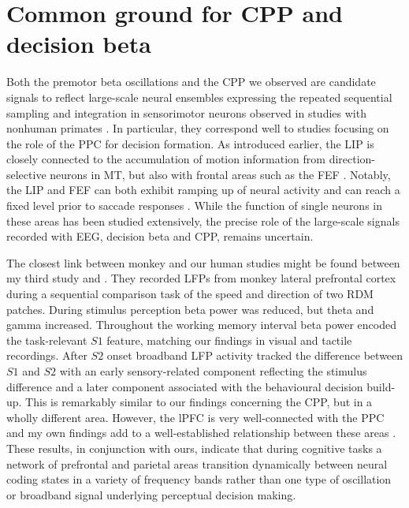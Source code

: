 \section{Common ground for CPP and decision beta}
Both the premotor beta oscillations and the CPP we observed are candidate signals to reflect large-scale neural ensembles expressing the repeated sequential sampling and integration in sensorimotor neurons observed in studies with nonhuman primates \parencite{Gold2007,Hanks2017,Kelly2015,Spitzer2017}. In particular, they correspond well to studies focusing on the role of the PPC for decision formation. As introduced earlier, the LIP is closely connected  to the accumulation of motion information from direction-selective neurons in MT, but also with frontal areas such as the FEF \parencite{Ding2012}. Notably, the LIP and FEF can both exhibit ramping up of neural activity and can reach a fixed level prior to saccade responses \parencite{Ding2010,Ding2012,Hanes1996,Roitman2002}. While the function of single neurons in these areas has been studied extensively, the precise role of the large-scale signals recorded with EEG, decision beta and CPP, remains uncertain.

The closest link between monkey and our human studies might be found between my third study and \textcite{Wimmer2016}. They recorded LFPs from monkey lateral prefrontal cortex during a sequential comparison task of the speed and direction of two RDM patches. During stimulus perception beta power was reduced, but theta and gamma increased. Throughout the working memory interval beta power encoded the task-relevant $S1$ feature, matching our findings in visual and tactile recordings. After $S2$ onset broadband LFP activity tracked the difference between $S1$ and $S2$ with an early sensory-related component reflecting the stimulus difference and a later component associated with the behavioural decision build-up. This is remarkably similar to our findings concerning the CPP, but in a wholly different area. However, the lPFC is very well-connected with the PPC \parencite{Cole2010} and my own findings add to a well-established relationship between these areas \parencite{Cole2013,Cole2007,Duncan2010,Muhle-Karbe2017,Nieder2016}. These results, in conjunction with ours, indicate that during cognitive tasks a network of prefrontal and parietal areas transition dynamically between neural coding states in a variety of frequency bands rather than one type of oscillation or broadband signal underlying perceptual decision making.

